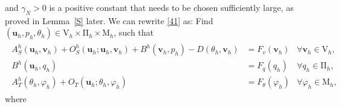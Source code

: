 \documentclass[10pt,a4paper]{article}
\begin{document}
  	and $\gamma_N>0$ is a positive constant that needs to be chosen sufficiently large, as proved in Lemma~\ref{S} later. We can rewrite \eqref{41} as:
  	    Find $(\boldsymbol{u}_h,p_h,\theta_h) \in \mathrm{V}_h \times \mathrm{\Pi}_h \times \mathrm{M}_h$, such that
  	    \begin{equation}\label{E}
  	    \begin{aligned}
  	    \begin{array}{rlrl}
  	    {A}_S^h(\boldsymbol{u}_h, \boldsymbol{v}_h) + {O}_S^h(\boldsymbol{u}_h ; \boldsymbol{u}_h, \boldsymbol{v}_h) + {B}^h(\boldsymbol{v}_h,p_h) - D(\theta_h,\boldsymbol{v}_h)& = F_{v}(\boldsymbol{v}_h) & \forall \boldsymbol{v}_h \in \mathrm{V}_h, \\
  	    {B}^h(\boldsymbol{u}_h, q_h) & = F_q(q_h) & \forall q_h \in \mathrm{\Pi}_h, \\ 
       {A}^h_T(\theta_h,\varphi_h) + O_T(\boldsymbol{u}_h; \theta_h, \varphi_h) & = F_{\theta}(\varphi_h) & \forall \varphi_h \in \mathrm{M}_{h},
  	    \end{array}
  	    \end{aligned}
  	    \end{equation} 
 where 
\end{document}
